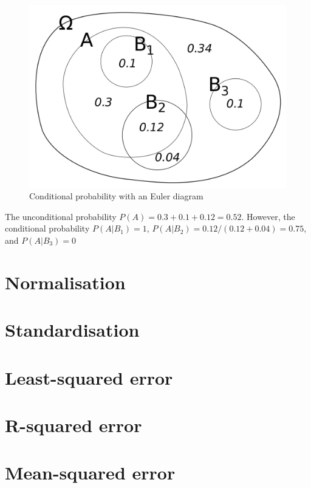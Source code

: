 \begin{figure}[h!]
\begin{center}
	\includegraphics[scale=0.06]{condition_prob.png}
	\caption[]{Conditional probability with an Euler diagram}
	\label{condition_prob}
	\end{center}
	\end{figure}

The unconditional probability $P(A) = 0.3 + 0.1 + 0.12 = 0.52$. However, the conditional probability $P(A|B_1) = 1$, $P(A|B_2) = 0.12 / (0.12 + 0.04) = 0.75$, and $P(A|B_3) = 0$

\section{Normalisation}

\section{Standardisation}

\section{Least-squared error}

\section{R-squared error}

\section{Mean-squared error}

